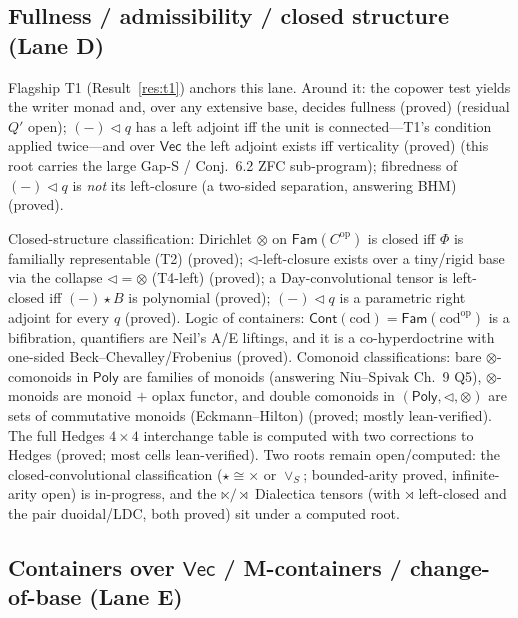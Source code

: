 \documentclass[11pt]{article}
\theoremstyle{definition}
\newcommand{\Poly}{\mathsf{Poly}}
\newcommand{\Cont}{\mathsf{Cont}}
\newcommand{\Vect}{\mathsf{Vec}}
\newcommand{\Fam}{\mathsf{Fam}}
\newcommand{\grade}[1]{{\small\textsf{(#1)}}}
\begin{document}
\subsection{Fullness / admissibility / closed structure (Lane D)}

Flagship T1 (Result~\ref{res:t1}) anchors this lane. Around it: the copower test yields the
writer monad and, over any extensive base, decides fullness \grade{proved} (residual $Q'$ open);
$(-)\lhd q$ has a left adjoint iff the unit is connected---T1's condition applied twice---and over
$\Vect$ the left adjoint exists iff verticality \grade{proved} (this root carries the large
Gap-S / Conj.\ 6.2 ZFC sub-program); fibredness of $(-)\lhd q$ is \emph{not} its left-closure
(a two-sided separation, answering BHM) \grade{proved}.

Closed-structure classification: Dirichlet $\otimes$ on $\Fam(C^{\mathrm{op}})$ is closed iff
$\Phi$ is familially representable (T2) \grade{proved}; $\lhd$-left-closure exists over a
tiny/rigid base via the collapse $\lhd = \otimes$ (T4-left) \grade{proved}; a Day-convolutional
tensor is left-closed iff $(-)\star B$ is polynomial \grade{proved}; $(-)\lhd q$ is a parametric
right adjoint for every $q$ \grade{proved}. Logic of containers: $\Cont(\mathrm{cod}) =
\Fam(\mathrm{cod}^{\mathrm{op}})$ is a bifibration, quantifiers are Neil's A/E liftings, and it is
a co-hyperdoctrine with one-sided Beck--Chevalley/Frobenius \grade{proved}. Comonoid
classifications: bare $\otimes$-comonoids in $\Poly$ are families of monoids (answering
Niu--Spivak Ch.\ 9 Q5), $\otimes$-monoids are monoid $+$ oplax functor, and double comonoids in
$(\Poly,\lhd,\otimes)$ are sets of commutative monoids (Eckmann--Hilton)
\grade{proved; mostly lean-verified}. The full Hedges $4\times4$ interchange table is computed with
two corrections to Hedges \grade{proved; most cells lean-verified}. Two roots remain open/computed:
the closed-convolutional classification ($\star \cong \times$ or $\vee_S$; bounded-arity proved,
infinite-arity open) is \textsf{in-progress}, and the $\ltimes/\rtimes$ Dialectica tensors
(with $\rtimes$ left-closed and the pair duoidal/LDC, both proved) sit under a \textsf{computed} root.

\subsection{Containers over $\Vect$ / M-containers / change-of-base (Lane E)}
\end{document}
